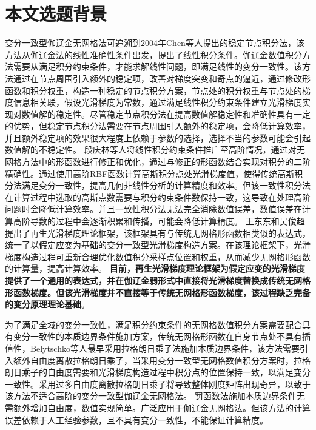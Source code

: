 \section{本文选题背景}
变分一致型伽辽金无网格法可追溯到2004年Chen等人\textsuperscript{\cite{chen2001}}提出的稳定节点积分法，该方法从伽辽金法的线性准确性条件出发，提出了线性积分条件。伽辽金数值积分方法需要从满足积分约束条件，才能求解线性问题，即满足线性的变分一致性。该方法通过在节点周围引入额外的稳定项，改善对梯度突变和奇点的逼近，通过修改形函数和积分权重，构造一种稳定的节点积分方案，节点处的积分权重与节点处的梯度信息相关联，假设光滑梯度为常数，通过满足线性积分约束条件建立光滑梯度实现对数值解的稳定性。尽管稳定节点积分法在提高数值解稳定性和准确性具有一定的优势，但稳定节点积分法需要在节点周围引入额外的稳定项，会降低计算效率，并且额外稳定项的效果很大程度上依赖于参数的选择，选择不当的参数可能会引起数值解的不稳定性。
段庆林等人\textsuperscript{\cite{陈嵩涛2020几何非线性分析的高效高阶无网格法,duan2012}}将线性积分约束条件推广至高阶情况，通过对无网格方法中的形函数进行修正和优化，通过与修正的形函数结合实现对积分的二阶精确性。通过使用高阶RBF函数计算高斯积分点处光滑梯度值，使得传统高斯积分法满足变分一致性，提高几何非线性分析的计算精度和效率。但该一致性积分法在计算过程中选取的高斯点数需要与积分约束条件数保持一致，这导致在处理高阶问题时会降低计算效率。并且一致性积分法无法完全消除数值误差，数值误差在计算高阶导数的过程中会逐渐积累和传播，可能会降低计算精度。
王东东和吴俊超提出了再生光滑梯度理论框架\textsuperscript{\cite{wang2019}}，该框架具有与传统无网格形函数相类似的表达式，统一了以假定应变为基础的变分一致型光滑梯度构造方案。在该理论框架下，光滑梯度构造过程可重新合理优化数值积分采样点位置和权重，从而减少无网格形函数的计算量，提高计算效率。
\textbf{目前，再生光滑梯度理论框架为假定应变的光滑梯度提供了一个通用的表达式，并在伽辽金弱形式中直接将光滑梯度替换成传统无网格形函数梯度。但该光滑梯度并不直接等于传统无网格形函数梯度，该过程缺乏完备的变分原理理论基础}。
\par
为了满足全域的变分一致性，满足积分约束条件的无网格数值积分方案需要配合具有变分一致性的本质边界条件施加方案，传统无网格形函数在自身节点处不具有插值性，Belytschko等人\textsuperscript{\cite{belytschko1994}}最早采用拉格朗日乘子法施加本质边界条件，该方法需要引入额外自由度离散拉格朗日乘子，当采用变分一致型无网格数值积分方案时，拉格朗日乘子的自由度需要和光滑梯度构造过程中积分点的位置保持一致，以满足变分一致性。采用过多自由度离散拉格朗日乘子将导致整体刚度矩阵出现奇异，以致于该方法不适合高阶的变分一致型伽辽金无网格法。
罚函数法\textsuperscript{\cite{zhu1998}}施加本质边界条件无需额外增加自由度，数值实现简单。广泛应用于伽辽金无网格法。但该方法的计算误差依赖于人工经验参数，且不具有变分一致性，不能保证计算精度。
